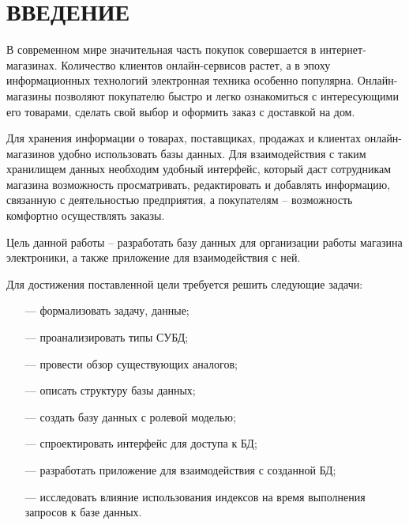 \section*{ВВЕДЕНИЕ}

В современном мире значительная часть покупок совершается в интернет-магазинах. Количество клиентов онлайн-сервисов растет, а в эпоху информационных технологий электронная техника особенно популярна. Онлайн-магазины позволяют покупателю быстро и легко ознакомиться с интересующими его товарами, сделать свой выбор и оформить заказ с доставкой на дом.

Для хранения информации о товарах, поставщиках, продажах и клиентах онлайн-магазинов удобно использовать базы данных. Для взаимодействия с таким хранилищем данных необходим удобный интерфейс, который даст сотрудникам магазина возможность просматривать, редактировать и добавлять информацию, связанную с деятельностью предприятия, а покупателям – возможность комфортно осуществлять заказы.

Цель данной работы – разработать базу данных для организации работы магазина электроники, а также приложение для взаимодействия с ней.

Для достижения поставленной цели требуется решить следующие задачи:

\begin{itemize}[leftmargin=0.7cm +  - ]
	\item[---] формализовать задачу, данные;
	\item[---] проанализировать типы СУБД;
	\item[---] провести обзор существующих аналогов;
	\item[---] описать структуру базы данных;
	\item[---] создать базу данных с ролевой моделью;
	\item[---] спроектировать интерфейс для доступа к БД;
	\item[---] разработать приложение для взаимодействия с созданной БД;
	\item[---] исследовать влияние использования индексов на время выполнения запросов к базе данных.
\end{itemize} 

\pagebreak
